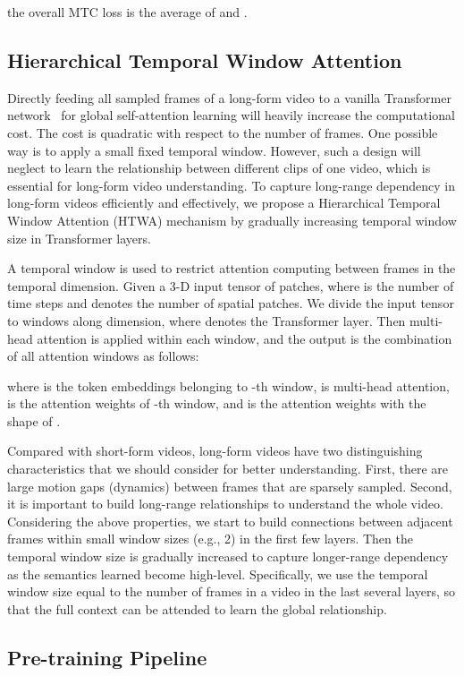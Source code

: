 \documentclass{article}
\begin{document}
the overall MTC loss  is the average of  and .


\subsection{Hierarchical Temporal Window Attention}\label{tem_window}
Directly feeding all sampled frames of a long-form video to a vanilla Transformer network~\cite{vaswani2017transformer} for global self-attention learning will heavily increase the computational cost. The cost is quadratic with respect to the number of frames.
One possible way is to apply a small fixed temporal window. However, such a design will neglect to learn the relationship between different clips of one video, which is essential for long-form video understanding. To capture long-range dependency in long-form videos efficiently and effectively, we propose a Hierarchical Temporal Window Attention (HTWA) mechanism by gradually increasing temporal window size in Transformer layers.

A temporal window is used to restrict attention computing between frames in the temporal dimension. Given a 3-D input tensor of  patches, where  is the number of time steps and  denotes the number of spatial patches. We divide the input tensor to  windows along  dimension, where  denotes the Transformer layer. Then multi-head attention is applied within each window, and the output is the combination of all attention windows as follows:

where  is the token embeddings belonging to -th window,  is multi-head attention,  is the attention weights of -th window, and  is the attention weights with the shape of .

Compared with short-form videos, long-form videos have two distinguishing characteristics that we should consider for better understanding. First, there are large motion gaps (dynamics) between frames that are sparsely sampled. Second, it is important to build long-range relationships to understand the whole video. Considering the above properties, we start to build connections between adjacent frames within small window sizes (e.g., 2) in the first few layers. 
Then the temporal window size is gradually increased to capture longer-range dependency as the semantics learned become high-level.
Specifically, we use the temporal window size equal to the number of frames in a video in the last several layers, so that the full context can be attended to learn the global relationship.

\subsection{Pre-training Pipeline}\label{pipeline}
\end{document}
